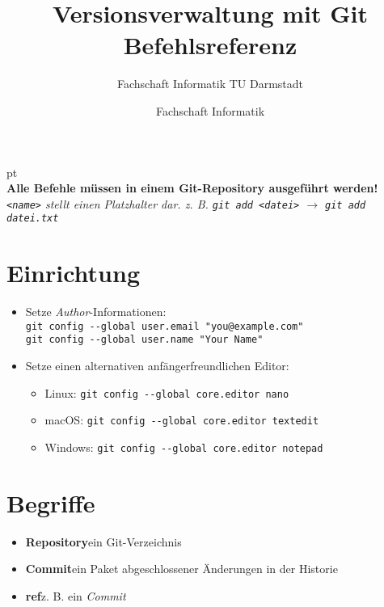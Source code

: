 \documentclass[accentcolor=TUDa-8b,colorbacktitle,12pt]{tudaexercise}
\author{Fachschaft Informatik}
\begin{document}
\title{Versionsverwaltung mit Git\\Befehlsreferenz}
\subtitle{Fachschaft Informatik TU Darmstadt}
\maketitle

 pt\\
\textbf{Alle Befehle müssen in einem Git-Repository ausgeführt werden!}\\
\textit{\lstinline|<name>| stellt einen Platzhalter dar. z. B. \lstinline|git add <datei>| $\rightarrow$ \lstinline|git add datei.txt|}
\section*{Einrichtung}
\begin{itemize}
	\item Setze \textit{Author}-Informationen:\\
	\lstinline|git config --global user.email "you@example.com"|\\
	\lstinline|git config --global user.name "Your Name"|

	\item Setze einen alternativen anfängerfreundlichen Editor:
	\begin{itemize}
		\item Linux: \tab\lstinline|git config --global core.editor nano|
		\item macOS: \tab\lstinline|git config --global core.editor textedit|
		\item Windows: \tab\lstinline|git config --global core.editor notepad|
	\end{itemize}
\end{itemize}

\section*{Begriffe}
\begin{itemize}
	\item \textbf{Repository}\tab ein Git-Verzeichnis
	\item \textbf{Commit}\tab ein Paket abgeschlossener Änderungen in der Historie
	\item \textbf{ref}\tab z. B. ein \textit{Commit}
\end{itemize}
\end{document}
